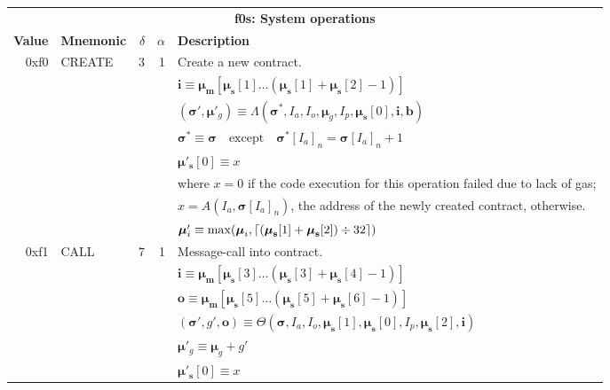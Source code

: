 \documentclass[9pt,oneside]{amsart}
\DeclarePairedDelimiter{\ceil}{\lceil}{\rceil}
\begin{document}
\begin{tabular*}{\columnwidth}[h]{rlrrl}
\toprule
\multicolumn{5}{c}{\textbf{f0s: System operations}} \vspace{5pt} \\
\textbf{Value} & \textbf{Mnemonic} & $\delta$ & $\alpha$ & \textbf{Description} \vspace{5pt} \\
0xf0 & {\small CREATE} & 3 & 1 & Create a new contract. \\
&&&& $\mathbf{i} \equiv \boldsymbol{\mu}_\mathbf{m}[ \boldsymbol{\mu}_\mathbf{s}[1] \dots (\boldsymbol{\mu}_\mathbf{s}[1] + \boldsymbol{\mu}_\mathbf{s}[2] - 1) ]$ \\
&&&& $(\boldsymbol{\sigma}', \boldsymbol{\mu}'_g) \equiv \Lambda(\boldsymbol{\sigma}^*, I_a, I_o, \boldsymbol{\mu}_g, I_p, \boldsymbol{\mu}_\mathbf{s}[0], \mathbf{i}, \mathbf{b})$ \\
&&&& $\boldsymbol{\sigma}^* \equiv \boldsymbol{\sigma} \quad \text{except} \quad \boldsymbol{\sigma}^*[I_a]_n = \boldsymbol{\sigma}[I_a]_n + 1$ \\
&&&& $\boldsymbol{\mu}'_\mathbf{s}[0] \equiv x$ \\
&&&& where $x=0$ if the code execution for this operation failed due to lack of gas;\\
&&&& $x=A(I_a, \boldsymbol{\sigma}[I_a]_n)$, the address of the newly created contract, otherwise. \\
&&&& $\boldsymbol{\mu}'_i \equiv \max(\boldsymbol{\mu}_i, \ceil{ (\boldsymbol{\mu}_\mathbf{s}[1] + \boldsymbol{\mu}_\mathbf{s}[2]) \div 32 })$ \\
\midrule
0xf1 & {\small CALL} & 7 & 1 & Message-call into contract. \\
&&&& $\mathbf{i} \equiv \boldsymbol{\mu}_\mathbf{m}[ \boldsymbol{\mu}_\mathbf{s}[3] \dots (\boldsymbol{\mu}_\mathbf{s}[3] + \boldsymbol{\mu}_\mathbf{s}[4] - 1) ]$ \\
&&&& $\mathbf{o} \equiv \boldsymbol{\mu}_\mathbf{m}[ \boldsymbol{\mu}_\mathbf{s}[5] \dots (\boldsymbol{\mu}_\mathbf{s}[5] + \boldsymbol{\mu}_\mathbf{s}[6] - 1) ]$ \\
&&&& $(\boldsymbol{\sigma}', g', \mathbf{o}) \equiv \Theta(\boldsymbol{\sigma}, I_a, I_o, \boldsymbol{\mu}_\mathbf{s}[1], \boldsymbol{\mu}_\mathbf{s}[0], I_p, \boldsymbol{\mu}_\mathbf{s}[2], \mathbf{i})$ \\
&&&& $\boldsymbol{\mu}'_g \equiv \boldsymbol{\mu}_g + g'$ \\
&&&& $\boldsymbol{\mu}'_\mathbf{s}[0] \equiv x$ \\

\end{tabular*}
\end{document}
